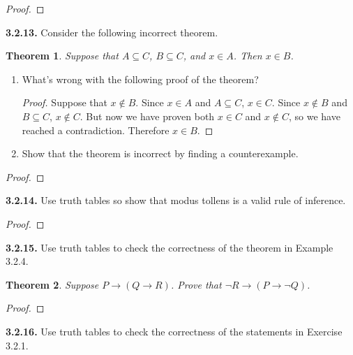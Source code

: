 \documentclass[12pt]{amsart}
\newenvironment{statement}[1]{\smallskip\noindent\color[rgb]{.6627, .3529, .6314} {\bf #1.}}{}
\newtheorem{theorem}{Theorem}
\theoremstyle{definition}
\theoremstyle{remark}
\begin{document}
\begin{proof}
\end{proof}


\begin{statement}{3.2.13}
Consider the following incorrect theorem.
\begin{theorem}
	Suppose that $A \subseteq C$, $B \subseteq C$, and $x \in A$.
	Then $x \in B$.
\end{theorem}
\begin{enumerate}
	\item What's wrong with the following proof of the theorem?
	\begin{proof}
		Suppose that $x \notin B$.
		Since $x \in A$ and $A \subseteq C$, $x \in C$.
		Since $x \notin B$ and $B \subseteq C$, $x \notin C$.
		But now we have proven both $x \in C$ and $x \notin C$,
		so we have reached a contradiction.
		Therefore $x \in B$.
	\end{proof}
	
	\item Show that the theorem is incorrect by finding a counterexample.
\end{enumerate}
\end{statement}

\begin{proof}
\end{proof}


\begin{statement}{3.2.14}
Use truth tables so show that modus tollens is a valid rule of inference.
\end{statement}

\begin{proof}
\end{proof}


\begin{statement}{3.2.15}
Use truth tables to check the correctness of the theorem in Example 3.2.4.
\begin{theorem}
	Suppose $P \rightarrow (Q \rightarrow R)$.
	Prove that $\neg R \rightarrow (P \rightarrow \neg Q)$.
\end{theorem}
\end{statement}

\begin{proof}
\end{proof}


\begin{statement}{3.2.16}
Use truth tables to check the correctness of the statements in Exercise 3.2.1.
\end{statement}
\end{document}
